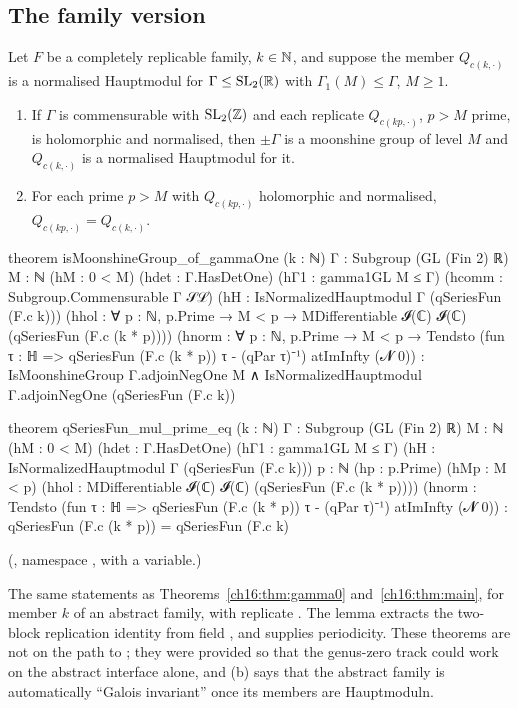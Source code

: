 \subsection{The family version}

\begin{theorem}\label{ch16:thm:family}
Let $F$ be a completely replicable family, $k\in{\mathbb{N}}$, and suppose the member $Q_{c(k,\cdot)}$ is a normalised Hauptmodul
for $\Gamma\le\mathrm{SL}_2(\mathbb{R})$ with $\Gamma_1(M)\le\Gamma$, $M\ge1$.
\begin{enumerate}[label=(\alph*)]
\item If $\Gamma$ is commensurable with $\mathrm{SL}_2(\mathbb{Z})$ and each replicate $Q_{c(kp,\cdot)}$, $p>M$ prime, is holomorphic
  and normalised, then $\pm\Gamma$ is a moonshine group of level $M$ and $Q_{c(k,\cdot)}$ is a normalised Hauptmodul for
  it.
\item For each prime $p>M$ with $Q_{c(kp,\cdot)}$ holomorphic and normalised, $Q_{c(kp,\cdot)}=Q_{c(k,\cdot)}$.
\end{enumerate}
\end{theorem}
\begin{leancode}
theorem isMoonshineGroup_of_gammaOne (k : ℕ) {Γ : Subgroup (GL (Fin 2) ℝ)} {M : ℕ}
    (hM : 0 < M) (hdet : Γ.HasDetOne) (hΓ1 : gamma1GL M ≤ Γ)
    (hcomm : Subgroup.Commensurable Γ 𝒮ℒ) (hH : IsNormalizedHauptmodul Γ (qSeriesFun (F.c k)))
    (hhol : ∀ p : ℕ, p.Prime → M < p → MDifferentiable 𝓘(ℂ) 𝓘(ℂ) (qSeriesFun (F.c (k * p))))
    (hnorm : ∀ p : ℕ, p.Prime → M < p →
      Tendsto (fun τ : ℍ => qSeriesFun (F.c (k * p)) τ - (qPar τ)⁻¹) atImInfty (𝓝 0)) :
    IsMoonshineGroup Γ.adjoinNegOne M ∧
      IsNormalizedHauptmodul Γ.adjoinNegOne (qSeriesFun (F.c k))

theorem qSeriesFun_mul_prime_eq (k : ℕ) {Γ : Subgroup (GL (Fin 2) ℝ)} {M : ℕ}
    (hM : 0 < M) (hdet : Γ.HasDetOne) (hΓ1 : gamma1GL M ≤ Γ)
    (hH : IsNormalizedHauptmodul Γ (qSeriesFun (F.c k))) {p : ℕ} (hp : p.Prime) (hMp : M < p)
    (hhol : MDifferentiable 𝓘(ℂ) 𝓘(ℂ) (qSeriesFun (F.c (k * p))))
    (hnorm : Tendsto (fun τ : ℍ => qSeriesFun (F.c (k * p)) τ - (qPar τ)⁻¹) atImInfty (𝓝 0)) :
    qSeriesFun (F.c (k * p)) = qSeriesFun (F.c k)
\end{leancode}
(, namespace ,
with  a variable.)
\begin{dictionary}
The same statements as Theorems~\ref{ch16:thm:gamma0} and~\ref{ch16:thm:main}, for member $k$ of an abstract family, with
replicate .  The lemma  extracts the two-block
replication identity from field , and  supplies periodicity.  These
theorems are not on the path to ; they were provided so that the genus-zero track could work on the
abstract interface alone, and (b) says that the abstract family is automatically ``Galois invariant'' once its members
are Hauptmoduln.
\end{dictionary}
